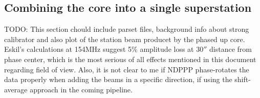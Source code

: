 \subsection{Combining the core into a single superstation}
TODO: This section chould include parset files, background info about strong
calibrator and also plot of the station beam producet by the phased up core.
Eskil's calculations at 154MHz suggest 5\% amplitude loss at 30$''$ distance
from phase center, which is the most serious of all effects mentioned in this
document regarding field of view. Also, it is not clear to me if NDPPP
phase-rotates the data properly when adding the beams in a specific direction,
if using the shift-average approach in the coming pipeline.

